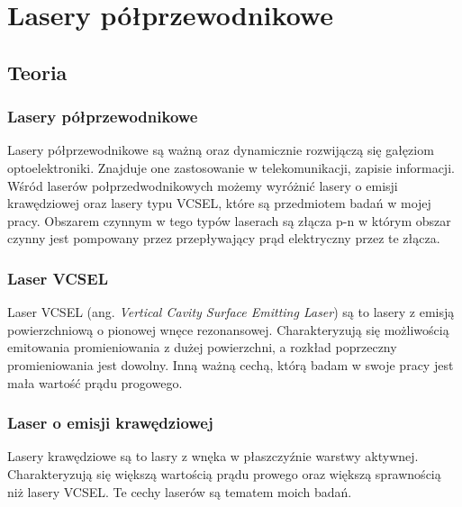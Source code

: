 \chapter{Lasery półprzewodnikowe}
\section{Teoria}
\subsection{Lasery półprzewodnikowe}
Lasery półprzewodnikowe są ważną oraz dynamicznie rozwijączą się gałęziom optoelektroniki. Znajduje one zastosowanie w telekomunikacji,
zapisie informacji. Wśród laserów połprzedwodnikowych możemy wyróżnić lasery o emisji krawędziowej oraz lasery typu VCSEL, które są przedmiotem
badań w mojej pracy. Obszarem czynnym w tego typów laserach są złącza p-n w którym obszar czynny jest pompowany przez przepływający prąd elektryczny
przez te złącza.
\subsection{Laser VCSEL}
Laser VCSEL (ang. \textit{Vertical Cavity Surface Emitting Laser}) są to lasery z emisją powierzchniową o pionowej wnęce rezonansowej.
Charakteryzują się możliwością emitowania promieniowania z dużej powierzchni, a rozkład poprzeczny promieniowania jest dowolny.
Inną ważną cechą, którą badam w swoje pracy jest mała wartość prądu progowego.
\subsection{Laser o emisji krawędziowej}
Lasery krawędziowe są to lasry z wnęka w  płaszczyźnie warstwy aktywnej. Charakteryzują się większą wartością prądu prowego
oraz większą sprawnością niż lasery VCSEL. Te cechy laserów są tematem moich badań.
